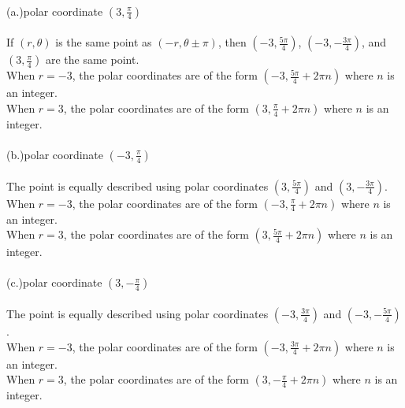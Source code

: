 \documentclass[12pt]{article}
\begin{document}
\\

\noindent(a.)polar coordinate $(3, \frac{\pi}{4})$\\\\
If $(r, \theta)$ is the same point as $(-r, \theta \pm \pi)$, then $(-3, \frac{5\pi}{4})$, $(-3, -\frac{3\pi}{4})$, and $(3, \frac{\pi}{4})$ are the same point. \\
When $r=-3$, the polar coordinates are of the form $(-3, \frac{5\pi}{4}+ 2\pi n)$ where $n$ is an integer.\\
When $r=3$, the polar coordinates are of the form $(3,\frac{\pi}{4}+ 2\pi n)$ where $n$ is an integer.\\\\


\noindent(b.)polar coordinate $(-3, \frac{\pi}{4})$\\\\
The point is equally described using polar coordinates $(3, \frac{5\pi}{4})$ and $(3, -\frac{3\pi}{4})$.\\
When $r=-3$, the polar coordinates are of the form $(-3, \frac{\pi}{4}+ 2\pi n)$ where $n$ is an integer.\\
When $r=3$, the polar coordinates are of the form $(3,\frac{5\pi}{4}+ 2\pi n)$ where $n$ is an integer.\\\\



\noindent(c.)polar coordinate $(3, -\frac{\pi}{4})$\\\\
The point is equally described using polar coordinates $(-3, \frac{3\pi}{4})$ and $(-3, -\frac{5\pi}{4})$.\\
When $r=-3$, the polar coordinates are of the form $(-3, \frac{3\pi}{4}+ 2\pi n)$ where $n$ is an integer.\\
When $r=3$, the polar coordinates are of the form $(3,-\frac{\pi}{4} + 2\pi n)$ where $n$ is an integer.\\\\
\end{document}
